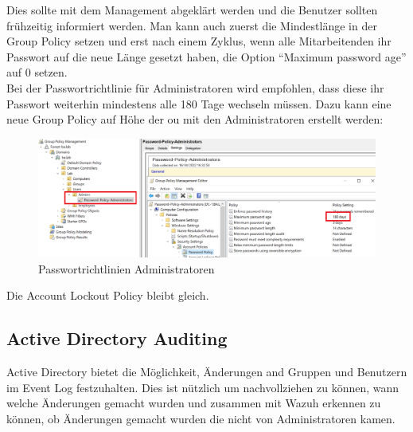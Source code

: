 Dies sollte mit dem Management abgeklärt werden und die Benutzer sollten frühzeitig informiert werden.
Man kann auch zuerst die Mindestlänge in der Group Policy setzen und erst nach einem Zyklus, wenn alle Mitarbeitenden ihr Passwort auf die neue Länge gesetzt haben, die Option ``Maximum password age'' auf 0 setzen. \\

Bei der Passwortrichtlinie für Administratoren wird empfohlen, dass diese ihr Passwort weiterhin mindestens alle 180 Tage wechseln müssen.
Dazu kann eine neue Group Policy auf Höhe der \acrshort{ou} mit den Administratoren erstellt werden:
\begin{figure}[H]
    \centering
    \includegraphics[width=0.7\linewidth]{../img/IAM/admin-password-policy.png}
    \caption{Passwortrichtlinien Administratoren}
\end{figure}
Die Account Lockout Policy bleibt gleich.

\subsection{Active Directory Auditing}
Active Directory bietet die Möglichkeit, Änderungen and Gruppen und Benutzern im Event Log festzuhalten.
Dies ist nützlich um nachvollziehen zu können, wann welche Änderungen gemacht wurden und zusammen mit Wazuh erkennen zu können, ob Änderungen gemacht wurden die nicht von Administratoren kamen.\\


